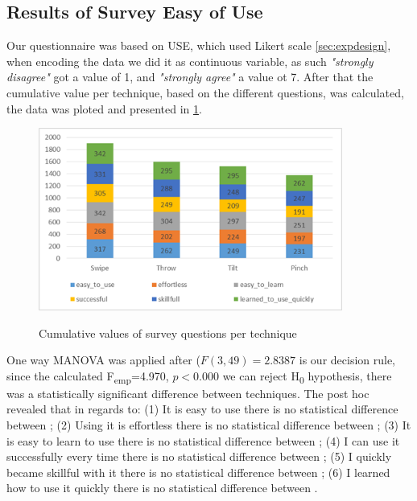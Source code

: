 \subsection{Results of Survey Easy of Use}
Our questionnaire was based on USE, which used Likert scale \ref*{sec:expdesign}, when encoding the data we did it as continuous variable, as such \emph{"strongly disagree"} got a value of 1, and \emph{"strongly agree"} a value ot 7. After that the cumulative value per technique, based on the different questions, was calculated, the data was ploted and presented in \ref{fig:surveyResult}. 
\begin{figure}[H]
	{\includegraphics[width = 1\columnwidth , height = 6cm ]{images/survey-data.png}} 
	\caption{
		Cumulative values of survey questions per technique
	}
	\label{fig:surveyResult}
\end{figure}

One way MANOVA  was applied after ($F(3, 49)=2.8387$ is our decision rule, since the calculated F\textsubscript{emp}=4.970, $p<0.000$ we can reject H\textsubscript{0} hypothesis, there was a statistically significant difference between techniques. The post hoc revealed that in regards to: (1) It is easy to use there is no statistical difference between \throw \tilt \pinch; (2) Using it is effortless there is no statistical difference between \throw \tilt \pinch; (3) It is easy to learn to use there is no statistical difference between \tilt \throw; (4) I can use it successfully every time there is no statistical difference between \tilt \pinch; (5) I quickly became skillful with it there is no statistical difference between \pinch \tilt; (6) I learned how to use it quickly  there is no statistical difference between \throw \tilt \pinch.